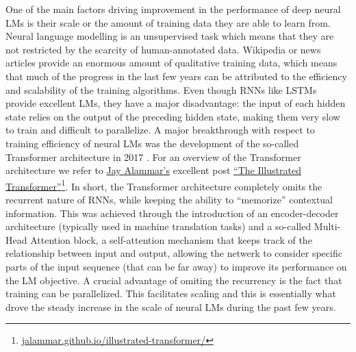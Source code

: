 \documentclass[12pt,a4paper,]{book}
\begin{document}
One of the main factors driving improvement in the performance of deep neural LMs is their scale or the amount of training data they are able to learn from. Neural language modelling is an unsupervised task which means that they are not restricted by the scarcity of human-annotated data. Wikipedia or news articles provide an enormous amount of qualitative training data, which means that much of the progress in the last few years can be attributed to the efficiency and scalability of the training algorithms. Even though RNNs like LSTMs provide excellent LMs, they have a major disadvantage: the input of each hidden state relies on the output of the preceding hidden state, making them very slow to train and difficult to parallelize. A major breakthrough with respect to training efficiency of neural LMs was the development of the so-called Transformer architecture in 2017 \citep{vaswani2017}. For an overview of the Transformer architecture we refer to \href{http://jalammar.github.io/}{Jay Alammar's} excellent post \href{http://jalammar.github.io/illustrated-transformer/}{``The Illustrated Transformer''}\footnote{\href{http://jalammar.github.io/illustrated-transformer/}{jalammar.github.io/illustrated-transformer/}}. In short, the Transformer architecture completely omits the recurrent nature of RNNs, while keeping the ability to ``memorize'' contextual information. This was achieved through the introduction of an encoder-decoder architecture (typically used in machine translation tasks) and a so-called Multi-Head Attention block, a self-attention mechanism that keeps track of the relationship between input and output, allowing the netwerk to consider specific parts of the input sequence (that can be far away) to improve its performance on the LM objective. A crucial advantage of omiting the recurrency is the fact that training can be parallelized. This facilitates scaling and this is essentially what drove the steady increase in the scale of neural LMs during the past few years.
\end{document}
